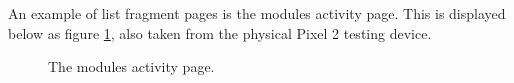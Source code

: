 \documentclass{article}
\begin{document}
An example of list fragment pages is the modules activity page. This is displayed below as figure \ref{figure:applicationModulesPage}, also taken from the physical Pixel 2 testing device. 

\begin{figure}[H]
	\centering
	\caption{The modules activity page.}
	\label{figure:applicationModulesPage}
\end{figure}

\end{document}
